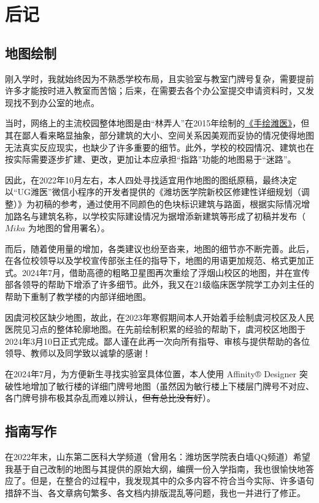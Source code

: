 \chapter[后记]{后记}
\section[地图绘制]{地图绘制}
刚入学时，我就始终因为不熟悉学校布局，且实验室与教室门牌号复杂，需要提前许多才能按时进入教室而苦恼；后来，在需要去各个办公室提交申请资料时，又发现找不到办公室的地点。

当时，网络上的主流校园整体地图是由“林弄人”在2015年绘制的\uline{\href{https://www.zcool.com.cn/work/ZMTgxMDQwMjg=.html}{《手绘潍医》}}，但其在鄙人看来略显抽象，部分建筑的大小、空间关系因美观而妥协的情况使得地图无法真实反应现实，也缺少了许多重要的细节。此外，学校的校园情况、建筑也在按实际需要逐步扩建、更改，更加让本应承担“指路”功能的地图易于“迷路”。

因此，在2022年10月左右，本人四处寻找适宜用作地图的图纸原稿，最终决定以“UG潍医”微信小程序的开发者提供的《潍坊医学院新校区修建性详细规划（调整）》为初稿的参考，通过使用不同颜色的色块标识建筑与路面，根据实际情况增加路名与建筑名称，以学校实际建设情况为据增添新建筑等形成了初稿并发布（$Mika$ 为地图的曾用署名）。

而后，随着使用量的增加，各类建议也纷至沓来，地图的细节亦不断完善。此后，在各位校领导以及学校宣传部张主任的指导下，地图的用语更加规范、格式更加正式。2024年7月，借助高德的粗略卫星图再次重绘了浮烟山校区的地图，并在宣传部各领导的帮助下增添了许多细节。此外，我又在21级临床医学院学工办刘主任的帮助下重制了教学楼的内部详细地图。

因虞河校区缺少地图，故此，在2023年寒假期间本人开始着手绘制虞河校区及人民医院见习点的整体轮廓地图。在先前绘制积累的经验的帮助下，虞河校区地图于2024年3月10日正式完成。鄙人谨在此再一次向所有指导、审核与提供帮助的各位领导、教师以及同学致以诚挚的感谢！

在2024年7月，为方便新生寻找实验室具体位置，本人使用 Affinity® Designer 突破性地增加了敏行楼的详细门牌号地图（虽然因为敏行楼上下楼层门牌号不对应、各门牌号排布极其杂乱而难以辨认，\sout{但有总比没有好}）。

\section[指南写作]{指南写作}

在2022年末，山东第二医科大学频道（曾用名：潍坊医学院表白墙QQ频道）希望我基于自己改制的地图与其提供的原始大纲，编撰一份入学指南，我也很愉快地答应了。但是，在整合的过程中，我发现其中的众多内容不符合当今实际、许多语句措辞不当、各文章病句繁多、各文档内排版混乱等问题，我也一并进行了修正。


